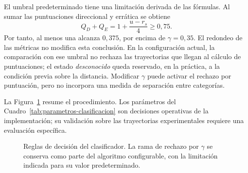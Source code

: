 El umbral predeterminado tiene una limitación derivada de las fórmulas. Al sumar las puntuaciones direccional y errática se obtiene
\begin{equation}
 Q_D+Q_E=1+\frac{u-r_s}{4}\geq 0{,}75.
\end{equation}
Por tanto, al menos una alcanza $0{,}375$, por encima de $\gamma=0{,}35$. El redondeo de las métricas no modifica esta conclusión. En la configuración actual, la comparación con ese umbral no rechaza las trayectorias que llegan al cálculo de puntuaciones; el estado \textit{desconocido} queda reservado, en la práctica, a la condición previa sobre la distancia. Modificar $\gamma$ puede activar el rechazo por puntuación, pero no incorpora una medida de separación entre categorías.

La Figura~\ref{fig:decision-clasificacion} resume el procedimiento. Los parámetros del Cuadro~\ref{tab:parametros-clasificacion} son decisiones operativas de la implementación; su validación sobre las trayectorias experimentales requiere una evaluación específica.

\begin{figure}[H]
 \centering
 \caption{Reglas de decisión del clasificador. La rama de rechazo por $\gamma$ se conserva como parte del algoritmo configurable, con la limitación indicada para su valor predeterminado.}
 \label{fig:decision-clasificacion}
\end{figure}

